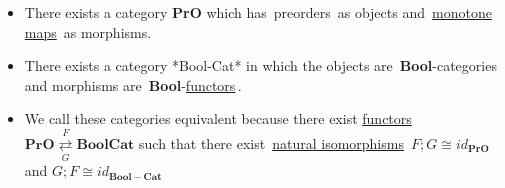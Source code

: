 \begin{itemize}
    \item  There exists a category \textbf{PrO} which has \,preorders\, as objects and \,\href{doc/1 math/Seven Sketches in Compositionality/Chapter 1: Generative Effects/4 Monotone maps/1 Monotone map}{monotone maps}\, as morphisms.
    \item There exists a category *Bool-Cat* in which the objects are \,\textbf{Bool}-categories\, and morphisms are \,\textbf{Bool}-\href{doc/1 math/Seven Sketches in Compositionality/Chapter 2: Resource theories/4 Constructions on V-categories/2 Enriched functors/1 V-functor}{functors}\,.
    \item We call these categories equivalent because there exist \href{doc/1 math/Seven Sketches in Compositionality/Chapter 3: Databases/3 Functors, natural transformations, and databases/2 Functors/1 Functor}{functors} $\mathbf{PrO}\overset{F}{\underset{G}{\rightleftarrows}}\mathbf{BoolCat}$ such that there exist \,\href{doc/1 math/Seven Sketches in Compositionality/Chapter 3: Databases/3 Functors, natural transformations, and databases/4 Natural transformations/1 Natural transformation}{natural isomorphisms}\, $F;G \cong id_\mathbf{PrO}$ and $G;F \cong id_\mathbf{Bool-Cat}$
  \end{itemize}
